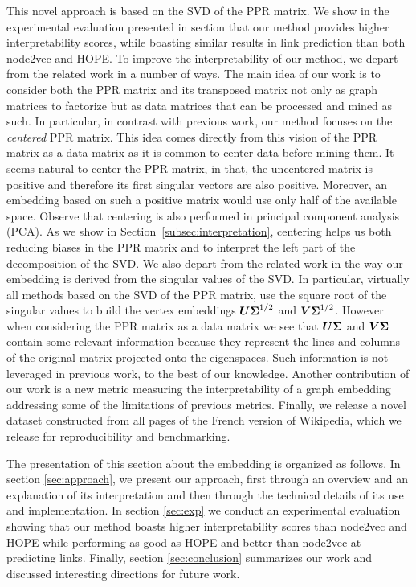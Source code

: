 This novel approach is based on the SVD of the PPR matrix. We show in the experimental evaluation presented in section  that our method provides higher interpretability scores, while boasting similar results in link prediction than both node2vec and HOPE. To improve the interpretability of our method, we depart from the related work in a number of ways. The main idea of our work is to consider both the PPR matrix and its transposed matrix not only as graph matrices to factorize but as data matrices that can be processed and mined as such. In particular, in contrast with previous work, our method focuses on the \textit{centered} PPR matrix. This idea comes directly from this vision of the PPR matrix as a data matrix as it is common to center data before mining them. It seems natural to center the PPR matrix, in that, the uncentered matrix is positive and therefore its first singular vectors are also positive. Moreover, an embedding based on such a positive matrix would use only half of the available space. Observe that centering is also performed in principal component analysis (PCA). As we show in Section~\ref{subsec:interpretation}, centering helps us both reducing biases in the PPR matrix and to interpret the left part of the decomposition of the SVD. We also depart from the related work in the way our embedding is derived from the singular values of the SVD. In particular, virtually all methods based on the SVD of the PPR matrix, use the square root of the singular values to build the vertex embeddings $\boldsymbol{U}\boldsymbol{\Sigma}^{1/2}$ and $\boldsymbol{V}\boldsymbol{\Sigma}^{1/2}$. However when considering the PPR matrix as a data matrix we see that $\boldsymbol{U}\boldsymbol{\Sigma}$ and $\boldsymbol{V}\boldsymbol{\Sigma}$ contain some relevant information because they represent the lines and columns of the original matrix projected onto the eigenspaces. Such information is not leveraged in previous work, to the best of our knowledge.  Another contribution of our work is a new metric measuring the interpretability of a graph embedding addressing some of the limitations of previous metrics. Finally, we release a novel dataset constructed from all pages of the French version of Wikipedia, which we release for reproducibility and benchmarking.

The presentation of this section about the \parfaite embedding is organized as follows. In section \ref{sec:approach}, we present our approach, first through an overview and an explanation of its interpretation and then through the technical details of its use and implementation. 
In section \ref{sec:exp} we conduct an experimental evaluation showing that our method boasts higher interpretability scores than node2vec and HOPE while performing as good as HOPE and better than node2vec at predicting links.
Finally, section \ref{sec:conclusion} summarizes our work and discussed interesting directions for future work.


